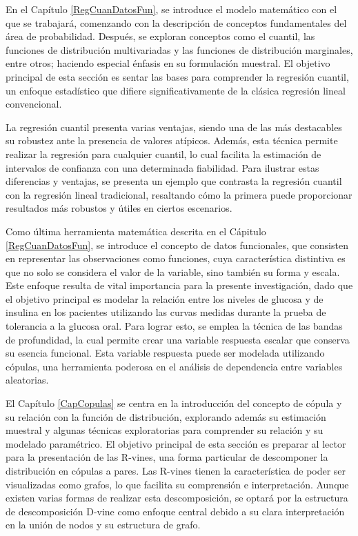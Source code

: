 En el Capítulo \ref{RegCuanDatosFun}, se introduce el modelo matemático con el que se trabajará, comenzando con la descripción de conceptos fundamentales del área de probabilidad. Después, se exploran conceptos como el cuantil, las funciones de distribución multivariadas y las funciones de distribución marginales, entre otros; haciendo especial énfasis en su formulación muestral. El objetivo principal de esta sección es sentar las bases para comprender la regresión cuantil, un enfoque estadístico que difiere significativamente de la clásica regresión lineal convencional.

La regresión cuantil presenta varias ventajas, siendo una de las más destacables su robustez ante la presencia de valores atípicos. Además, esta técnica permite realizar la regresión para cualquier cuantil, lo cual facilita la estimación de intervalos de confianza con una determinada fiabilidad. Para ilustrar estas diferencias y ventajas, se presenta un ejemplo que contrasta la regresión cuantil con la regresión lineal tradicional, resaltando cómo la primera puede proporcionar resultados más robustos y útiles en ciertos escenarios.

Como última herramienta matemática descrita en el Cápitulo \ref{RegCuanDatosFun}, se introduce el concepto de datos funcionales, que consisten en representar las observaciones como funciones, cuya característica distintiva es que no solo se considera el valor de la variable, sino también su forma y escala. Este enfoque resulta de vital importancia para la presente investigación, dado que el objetivo principal es modelar la relación entre los niveles de glucosa y de insulina en los pacientes utilizando las curvas medidas durante la prueba de tolerancia a la glucosa oral. Para lograr esto, se emplea la técnica de las bandas de profundidad, la cual permite crear una variable respuesta escalar que conserva su esencia funcional. Esta variable respuesta puede ser modelada utilizando cópulas, una herramienta poderosa en el análisis de dependencia entre variables aleatorias. 

El Capítulo \ref{CapCopulas} se centra en la introducción del concepto de cópula y su relación con la función de distribución, explorando además su estimación muestral y algunas técnicas exploratorias para comprender su relación y su modelado paramétrico. El objetivo principal de esta sección es preparar al lector para la presentación de las R-vines, una forma particular de descomponer la distribución en cópulas a pares. Las R-vines tienen la característica de poder ser visualizadas como grafos, lo que facilita su comprensión e interpretación. Aunque existen varias formas de realizar esta descomposición, se optará por la estructura de descomposición D-vine como enfoque central debido a su clara interpretación en la unión de nodos y su estructura de grafo.

